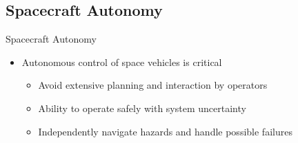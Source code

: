 \subsection[Spacecraft Autonomy]{Spacecraft Autonomy}

\begin{frame}[t]{Spacecraft Autonomy} %
\begin{itemize}
    \item Autonomous control of space vehicles is critical
    \begin{itemize}
        \item Avoid extensive planning and interaction by operators
        \item Ability to operate safely with system uncertainty 
        \item Independently navigate hazards and handle possible failures
    \end{itemize}
\end{itemize}
\end{frame}   %

